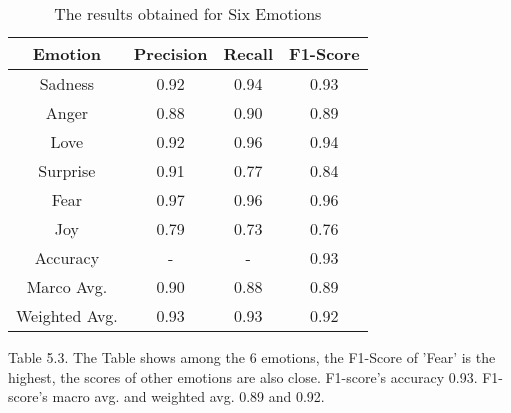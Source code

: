 \begin{table}[h!]
\centering
\begin{tabular}{|c|c|c|c|}
\hline
Emotion       & Precision & Recall & F1-Score \\ \hline
Sadness       & 0.92      & 0.94   & 0.93     \\ \hline
Anger         & 0.88      & 0.90   & 0.89     \\ \hline
Love          & 0.92      & 0.96   & 0.94     \\ \hline
Surprise      & 0.91      & 0.77   & 0.84     \\ \hline
Fear          & 0.97      & 0.96   & 0.96     \\ \hline
Joy           & 0.79      & 0.73   & 0.76     \\ \hline
Accuracy      & -         & -      & 0.93     \\ \hline
Marco Avg.    & 0.90      & 0.88   & 0.89     \\ \hline
Weighted Avg. & 0.93      & 0.93   & 0.92     \\ \hline
\end{tabular}
\caption{The results obtained for Six Emotions}
\end{table}

Table 5.3. The Table shows among the 6 emotions,  the F1-Score of 'Fear' is the highest, the scores of other emotions are also close. F1-score's accuracy 0.93. F1-score's macro avg. and weighted avg. 0.89 and 0.92.